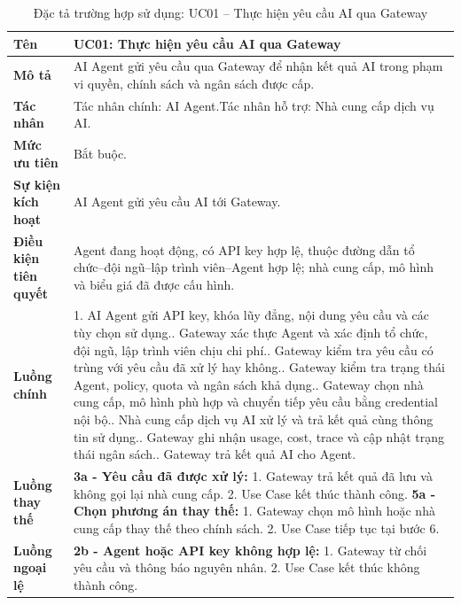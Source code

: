 \begin{longtable}{|L{4.2cm}|L{9.5cm}|}
\caption[Đặc tả UC01]{Đặc tả trường hợp sử dụng: UC01 -- Thực hiện yêu cầu AI qua Gateway} \\\hline
\textbf{Tên} & UC01: Thực hiện yêu cầu AI qua Gateway \\\hline
\textbf{Mô tả} & AI Agent gửi yêu cầu qua Gateway để nhận kết quả AI trong phạm vi quyền, chính sách và ngân sách được cấp.\\\hline
\textbf{Tác nhân} & Tác nhân chính: AI Agent.\newline Tác nhân hỗ trợ: Nhà cung cấp dịch vụ AI.\\\hline
\textbf{Mức ưu tiên} & Bắt buộc.\\\hline
\textbf{Sự kiện kích hoạt} & AI Agent gửi yêu cầu AI tới Gateway.\\\hline
\textbf{Điều kiện tiên quyết} & Agent đang hoạt động, có API key hợp lệ, thuộc đường dẫn tổ chức--đội ngũ--lập trình viên--Agent hợp lệ; nhà cung cấp, mô hình và biểu giá đã được cấu hình.\\\hline
\textbf{Luồng chính} &
1. AI Agent gửi API key, khóa lũy đẳng, nội dung yêu cầu và các tùy chọn sử dụng.. Gateway xác thực Agent và xác định tổ chức, đội ngũ, lập trình viên chịu chi phí.. Gateway kiểm tra yêu cầu có trùng với yêu cầu đã xử lý hay không.. Gateway kiểm tra trạng thái Agent, policy, quota và ngân sách khả dụng.. Gateway chọn nhà cung cấp, mô hình phù hợp và chuyển tiếp yêu cầu bằng credential nội bộ.. Nhà cung cấp dịch vụ AI xử lý và trả kết quả cùng thông tin sử dụng.. Gateway ghi nhận usage, cost, trace và cập nhật trạng thái ngân sách.. Gateway trả kết quả AI cho Agent.\\\hline
\textbf{Luồng thay thế} &
\textbf{3a - Yêu cầu đã được xử lý:} 1. Gateway trả kết quả đã lưu và không gọi lại nhà cung cấp. 2. Use Case kết thúc thành công.\newline
\textbf{5a - Chọn phương án thay thế:} 1. Gateway chọn mô hình hoặc nhà cung cấp thay thế theo chính sách. 2. Use Case tiếp tục tại bước 6.\\\hline
\textbf{Luồng ngoại lệ} &
\textbf{2b - Agent hoặc API key không hợp lệ:} 1. Gateway từ chối yêu cầu và thông báo nguyên nhân. 2. Use Case kết thúc không thành công.\newline

\end{longtable}
